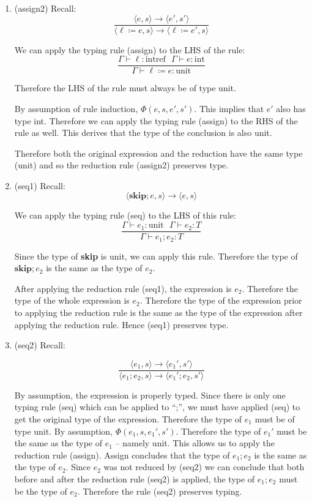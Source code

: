 \documentclass[10pt,\jkfside,a4paper]{article}
\begin{document}
\begin{enumerate}
\begin{enumerate}[label=\textbf{Case}]
\item (assign2) Recall:
\[
\dfrac{\langle e, s \rangle\to \langle e', s' \rangle}
{\langle \ell \coloneqq e, s \rangle \to \langle \ell \coloneqq e', s \rangle}
\]

We can apply the typing rule (assign) to the LHS of the rule:
\[
\dfrac{\Gamma \vdash \ell: \text{intref} \ \ \ \Gamma \vdash e: \text{int}}
{\Gamma \vdash \ell \coloneqq e: \text{unit}}
\]

Therefore the LHS of the rule must always be of type unit.

By assumption of rule induction, $\Phi(e, s, e', s')$. This implies that
$e'$ also has type int. Therefore we can apply the typing rule (assign) to
the RHS of the rule as well. This derives that the type of the conclusion is
also unit.

Therefore both the original expression and the reduction have the same type
(unit) and so the reduction rule (assign2) preserves type.

\item (seq1) Recall:
\[
\langle \textbf{skip}; e, s \rangle \to \langle e, s \rangle
\]

We can apply the typing rule (seq) to the LHS of this rule:
\[
\dfrac{\Gamma \vdash e_1: \text{unit} \ \ \ \Gamma \vdash e_2: T}{\Gamma
\vdash e_1; e_2: T}
\]

Since the type of \textbf{skip} is unit, we can apply this rule. Therefore
the type of $\textbf{skip}; e_2$ is the same as the type of $e_2$.

After applying the reduction rule (seq1), the expression is $e_2$. Therefore
the type of the whole expression is $e_2$. Therefore the type of the
expression prior to applying the reduction rule is the same as the type of
the expression after applying the reduction rule. Hence (seq1) preserves type.

\item (seq2) Recall:

\[
\dfrac{\langle e_1, s \rangle \to \langle e_1', s' \rangle }
{ \langle e_1; e_2, s \rangle \to \langle e_1';e_2, s' \rangle}
\]

By assumption, the expression is properly typed. Since there is only one
typing rule (seq) which can be applied to ``;'', we must have applied (seq)
to get the original type of the expression. Therefore the type of $e_1$ must
be of type unit. By assumption, $\Phi(e_1, s, e_1', s')$. Therefore the type
of $e_1'$ must be the same as the type of $e_1$ -- namely unit. This allows
us to apply the reduction rule (assign). Assign concludes that the type of
$e_1; e_2$ is the same as the type of $e_2$. Since $e_2$ was not reduced by
(seq2) we can conclude that both before and after the reduction rule (seq2)
is applied, the type of $e_1; e_2$ must be the type of $e_2$. Therefore the
rule (seq2) preserves typing.


\end{enumerate}
\end{enumerate}
\end{document}
